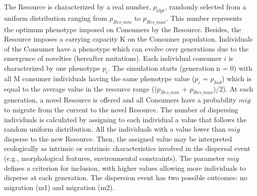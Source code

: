 The Resource is characterized by a real number, $p_{Opt}$, randomly selected from a uniform distribution ranging from $p_{Res\_min}$ to $p_{Res\_max}$. This number represents the optimum phenotype imposed on Consumers by the Resource. Besides, the Resource imposes a carrying capacity K on the Consumer population. Individuals of the Consumer have a phenotype which can evolve over generations due to the emergence of novelties (hereafter mutations). Each individual consumer $i$ is characterized by one phenotype $p_{i}$. 
The simulation starts (generation n = 0) with all M consumer individuals having the same phenotype value ($p_{i}$ = $p_{Ind}$) which is equal to the average value in the resource range (($p_{Res\_min}$ + $p_{Res\_max}$)/2).
At each generation, a novel Resource is offered and all Consumers have a probability $mig$ to migrate from the current to the novel Resource. The number of dispersing individuals is calculated by assigning to each individual a value that follows the random uniform distribution. All the individuals with a value lower than $mig$ disperse to the new Resource. Then, the assigned value may be interpreted ecologically as intrinsic or extrinsic characteristics involved in the dispersal event (e.g., morphological features, environmental constraints). The parameter $mig$ defines a criterion for inclusion, with higher values allowing more individuals to disperse at each generation. The dispersion event has two possible outcomes: no migration (m1) and migration (m2).
